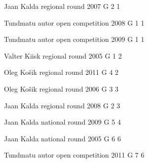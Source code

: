 \documentclass[11pt]{article}
\begin{document}
\ylDisplay{} %
{Jaan Kalda} %
{regional round} %
{2007} %
{G 2} %
{1} %
{

\ifEngSolution
\fi
}

\ylDisplay{} %
{Tundmatu autor} %
{open competition} %
{2008} %
{G 1} %
{1} %
{

\ifEngSolution
\fi
}

\ylDisplay{} %
{Tundmatu autor} %
{open competition} %
{2009} %
{G 1} %
{1} %
{

\ifEngSolution
\fi
}

\ylDisplay{} %
{Valter Kiisk} %
{regional round} %
{2005} %
{G 1} %
{2} %
{

\ifEngSolution
\fi
}

\ylDisplay{} %
{Oleg Košik} %
{regional round} %
{2011} %
{G 4} %
{2} %
{

\ifEngSolution
\fi
}

\ylDisplay{} %
{Oleg Košik} %
{regional round} %
{2006} %
{G 3} %
{3} %
{

\ifEngSolution
\fi
}

\ylDisplay{} %
{Jaan Kalda} %
{regional round} %
{2008} %
{G 2} %
{3} %
{

\ifEngSolution
\fi
}

\ylDisplay{} %
{Jaan Kalda} %
{national round} %
{2009} %
{G 5} %
{4} %
{

\ifEngSolution
\fi
}

\ylDisplay{} %
{Jaan Kalda} %
{national round} %
{2005} %
{G 6} %
{6} %
{

\ifEngSolution
\fi
}

\ylDisplay{} %
{Tundmatu autor} %
{open competition} %
{2011} %
{G 7} %
{6} %
{

\ifEngSolution
\fi
}
\end{document}
